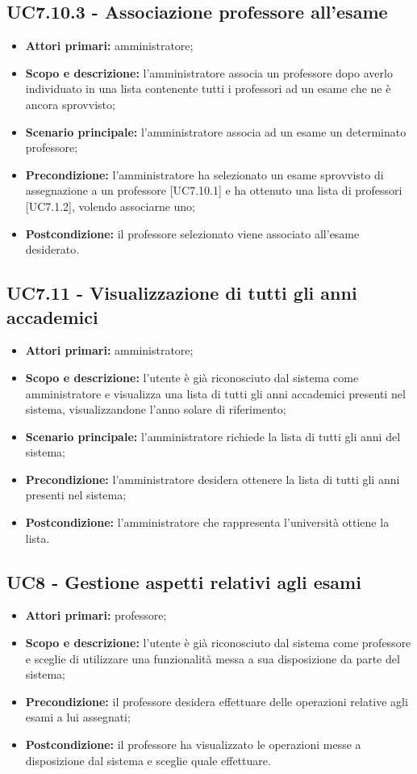 \documentclass[AnalisiDeiRequisiti.tex]{subfiles}
\begin{document}
\subsection{UC7.10.3 - Associazione professore all'esame}
\begin{itemize}
	\item \textbf{Attori primari:} amministratore;
	\item \textbf{Scopo e descrizione:} l'amministratore associa un professore dopo averlo individuato in una lista contenente tutti i professori ad un esame che ne è ancora sprovvisto;
	\item \textbf{Scenario principale:} l'amministratore associa ad un esame un determinato professore;
	\item \textbf{Precondizione:} l'amministratore ha selezionato un esame sprovvisto di assegnazione a un professore [UC7.10.1] e ha ottenuto una lista di professori [UC7.1.2], volendo associarne uno; 
	\item \textbf{Postcondizione:} il professore selezionato viene associato all'esame desiderato.
\end{itemize}
\subsection{UC7.11 - Visualizzazione di tutti gli anni accademici}
\begin{itemize}
	\item \textbf{Attori primari:} amministratore;
	\item \textbf{Scopo e descrizione:} l'utente è già riconosciuto dal sistema come amministratore e visualizza una lista di tutti gli anni accademici presenti nel sistema, visualizzandone l'anno solare di riferimento;
	\item \textbf{Scenario principale:} l'amministratore richiede la lista di tutti gli anni del sistema;
	\item \textbf{Precondizione:} l'amministratore desidera ottenere la lista di tutti gli anni presenti nel sistema; 
	\item \textbf{Postcondizione:} l'amministratore che rappresenta l'università ottiene la lista.
\end{itemize}

\subsection{UC8 - Gestione aspetti relativi agli esami}
\begin{itemize}
	\item \textbf{Attori primari:} professore;
	\item \textbf{Scopo e descrizione:} l'utente è già riconosciuto dal sistema come professore e sceglie di utilizzare una funzionalità messa a sua disposizione da parte del sistema;
	\item \textbf{Precondizione:} il professore desidera effettuare delle operazioni relative agli esami a lui assegnati;
	\item \textbf{Postcondizione:} il professore ha visualizzato le operazioni messe a disposizione dal sistema e sceglie quale effettuare.
\end{itemize}
\end{document}
